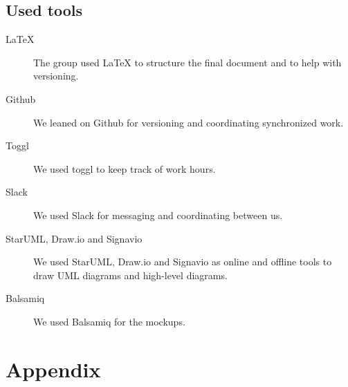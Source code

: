 \documentclass[12pt, a4paper]{article}
\begin{document}
		\subsection{Used tools}
		\begin{description}
			\item [LaTeX] The group used LaTeX to structure the final document and to help with versioning.
			\item [Github] We leaned on Github for versioning and coordinating synchronized work.
			\item [Toggl] We used toggl to keep track of work hours.
			\item [Slack] We used Slack for messaging and coordinating between us.
			\item [StarUML, Draw.io and Signavio] We used StarUML, Draw.io and Signavio as online and offline tools to draw UML diagrams and high-level diagrams.
			\item [Balsamiq] We used Balsamiq for the mockups.
		\end{description}

	\newpage
	\section{Appendix}
	\listoffigures
	\listoftables
\end{document}
